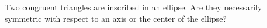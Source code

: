 Two congruent triangles are inscribed in an ellipse. Are they necessarily symmetric with respect to an axis or the center of the ellipse?
